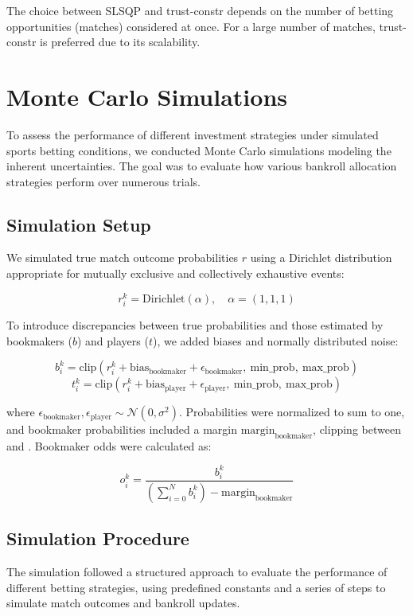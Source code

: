 The choice between SLSQP and trust-constr depends on the number of betting opportunities (matches) considered at once. For a large number of matches, trust-constr is preferred due to its scalability.


\section{Monte Carlo Simulations}

To assess the performance of different investment strategies under simulated sports betting conditions, we conducted Monte Carlo simulations modeling the inherent uncertainties. The goal was to evaluate how various bankroll allocation strategies perform over numerous trials.

\subsection{Simulation Setup}

We simulated true match outcome probabilities \( r \) using a Dirichlet distribution appropriate for mutually exclusive and collectively exhaustive events:

\[
r_i^k = \text{Dirichlet}(\alpha), \quad \alpha = (1, 1, 1)
\]

To introduce discrepancies between true probabilities and those estimated by bookmakers (\( b \)) and players (\( t \)), we added biases and normally distributed noise:

\[
b_i^k = \text{clip}(r_i^k + \text{bias}_{\text{bookmaker}} + \epsilon_{\text{bookmaker}}, \ \text{min\_prob}, \ \text{max\_prob})
\]
\[
t_i^k = \text{clip}(r_i^k + \text{bias}_{\text{player}} + \epsilon_{\text{player}}, \ \text{min\_prob}, \ \text{max\_prob})
\]

where \( \epsilon_{\text{bookmaker}}, \epsilon_{\text{player}} \sim \mathcal{N}(0, \sigma^2) \). Probabilities were normalized to sum to one, and bookmaker probabilities included a margin \( \text{margin}_{\text{bookmaker}} \), clipping between  and . Bookmaker odds were calculated as:

\[
o_i^k = \frac{b_i^k}{(\sum_{i=0}^N b_i^k) - \text{margin}_{\text{bookmaker}}}
\]

\subsection{Simulation Procedure}

The simulation followed a structured approach to evaluate the performance of different betting strategies, using predefined constants and a series of steps to simulate match outcomes and bankroll updates.

